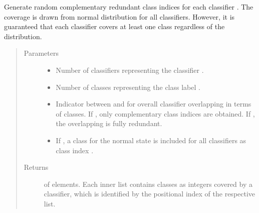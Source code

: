 \documentclass[letterpaper,10pt,english]{sphinxmanual}
\begin{document}
\begin{fulllineitems}
\label{\detokenize{pusion.util.generator:pusion.util.generator.generate_classification_coverage}}
\sphinxAtStartPar
Generate random complementary redundant class indices for each classifier .
The coverage is drawn from normal distribution for all classifiers.
However, it is guaranteed that each classifier covers at least one class regardless of the distribution.
\begin{quote}\begin{description}
\item[{Parameters}] \leavevmode\begin{itemize}
\item {} 
\sphinxAtStartPar
{} \textendash{} Number of classifiers representing the classifier .

\item {} 
\sphinxAtStartPar
{} \textendash{} Number of classes representing the class label .

\item {} 
\sphinxAtStartPar
{} \textendash{} Indicator between  and  for overall classifier overlapping in terms of classes.
If , only complementary class indices are obtained.
If , the overlapping is fully redundant.

\item {} 
\sphinxAtStartPar
{} \textendash{} If , a class for the normal state is included for all classifiers as class index .

\end{itemize}

\item[{Returns}] \leavevmode
\sphinxAtStartPar
{} of  elements. Each inner list contains classes as integers covered by a classifier,
which is identified by the positional index of the respective list.

\end{description}\end{quote}

\end{fulllineitems}
\end{document}
